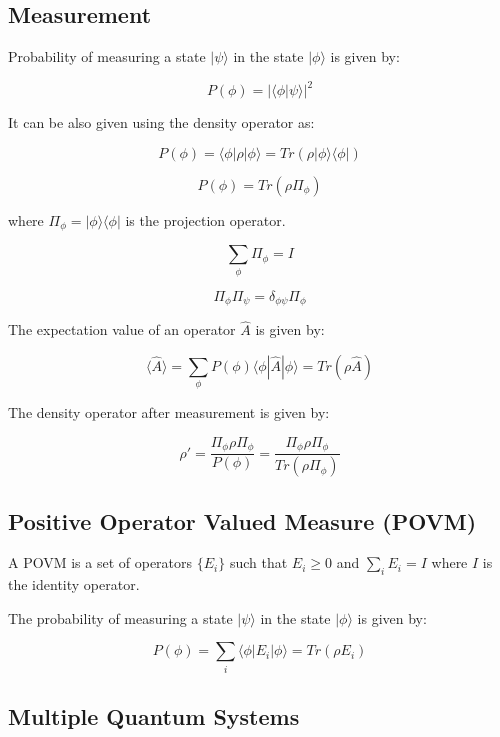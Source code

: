 \documentclass[
  letterpaper,
  DIV=11,
  numbers=noendperiod]{scrreprt}
\begin{document}
\subsection*{Measurement}\label{measurement}

Probability of measuring a state \(|\psi\rangle\) in the state
\(|\phi\rangle\) is given by:

\[P(\phi) = |\langle \phi | \psi \rangle|^2\]

It can be also given using the density operator as:

\[P(\phi) = \langle \phi | \rho | \phi \rangle = Tr(\rho |\phi\rangle \langle \phi|)\]

\[ P(\phi) = Tr(\rho \Pi_\phi) \]

where \(\Pi_\phi = |\phi\rangle \langle \phi|\) is the projection
operator.

\[\sum_{\phi} \Pi_\phi = I\]

\[\Pi_\phi \Pi_\psi = \delta_{\phi\psi} \Pi_\phi\]

The expectation value of an operator \(\hat{A}\) is given by:

\[\langle \hat{A} \rangle = \sum_{\phi} P(\phi) \langle \phi | \hat{A} | \phi \rangle = Tr(\rho \hat{A})\]

The density operator after measurement is given by:

\[ \rho' = \frac{\Pi_\phi \rho \Pi_\phi}{P(\phi)} = \frac{\Pi_\phi \rho \Pi_\phi}{Tr(\rho \Pi_\phi)} \]

\subsection*{Positive Operator Valued Measure
(POVM)}\label{positive-operator-valued-measure-povm}

A POVM is a set of operators \(\{E_i\}\) such that \(E_i \geq 0\) and
\(\sum_i E_i = I\) where \(I\) is the identity operator.

The probability of measuring a state \(|\psi\rangle\) in the state
\(|\phi\rangle\) is given by:

\[P(\phi) = \sum_i \langle \phi | E_i | \phi \rangle = Tr(\rho E_i)\]

\subsection*{Multiple Quantum Systems}\label{multiple-quantum-systems}
\end{document}
